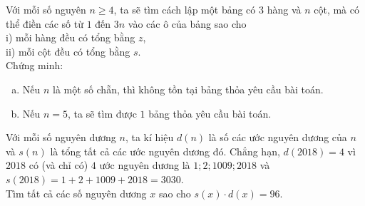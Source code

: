 \begin{ex}%
Với mỗi số nguyên $n\ge 4$, ta sẽ tìm cách lập một bảng có 3 hàng và $n$ cột, mà có thể điền các số từ $1$ đến $3n$ vào các ô của bảng sao cho \\
i)  mỗi hàng đều có tổng bằng $z$,\\
ii) mỗi cột đều có tổng bằng $s$.\\
Chứng minh:
\begin{enumerate}[a)]
\item Nếu $n$ là một số chẵn, thì không tồn tại bảng thỏa yêu cầu bài toán.
\item Nếu $n=5$, ta sẽ tìm được $1$ bảng thỏa yêu cầu bài toán.
\end{enumerate}
\end{ex}

\begin{ex}%
Với mỗi số nguyên dương $n$, ta kí hiệu $d(n)$ là số các ước nguyên dương của $n$ và $s(n)$ là tổng tất cả các ước nguyên dương đó. Chẳng hạn, $d(2018) =4$ vì $2018$ có (và chỉ có) $4$ ước nguyên dương là $1;2;1009;2018$ và $s(2018)=1+2+1009+2018=3030$.\\
Tìm tất cả các số nguyên dương $x$ sao cho $s(x)\cdot d(x)=96$.\\

\end{ex}
